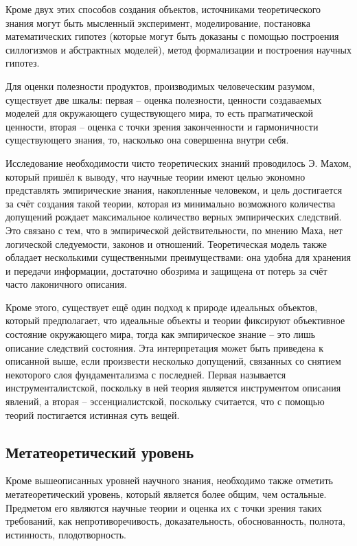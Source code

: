 \documentclass[14pt]{article}
\begin{document}
Кроме двух этих способов создания объектов, источниками теоретического знания могут быть мысленный эксперимент, моделирование, постановка математических гипотез (которые могут быть доказаны с помощью построения силлогизмов и абстрактных моделей), метод формализации и построения научных гипотез.  
  
  Для оценки полезности продуктов, производимых человеческим разумом, существует две шкалы: первая -- оценка полезности, ценности создаваемых моделей для окружающего существующего мира, то есть прагматической ценности, вторая -- оценка с точки зрения законченности и гармоничности существующего знания, то, насколько она совершенна внутри себя. 
  
  Исследование необходимости чисто теоретических знаний проводилось Э. Махом, который пришёл к выводу, что научные теории имеют целью экономно представлять эмпирические знания, накопленные человеком, и цель достигается за счёт создания такой теории, которая из минимально возможного количества допущений рождает максимальное количество верных эмпирических следствий. Это связано с тем, что в эмпирической действительности, по мнению Маха, нет логической следуемости, законов и отношений. Теоретическая модель также обладает несколькими существенными преимуществами: она удобна для хранения и передачи информации, достаточно обозрима и защищена от потерь за счёт часто лаконичного описания.  
  
Кроме этого, существует ещё один подход к природе идеальных объектов, который предполагает, что идеальные объекты и теории фиксируют объективное состояние окружающего мира, тогда как эмпирическое знание -- это лишь описание следствий состояния. Эта интерпретация может быть приведена к описанной выше, если произвести несколько допущений, связанных со снятием некоторого слоя фундаментализма с последней. Первая называется инструменталистской, поскольку в ней теория является инструментом описания явлений, а вторая -- эссенциалистской, поскольку считается, что с помощью теорий постигается истинная суть вещей. 
\subsection{Метатеоретический уровень}
Кроме вышеописанных уровней научного знания, необходимо также отметить метатеоретический уровень, который является более общим, чем остальные. Предметом его являются научные теории и оценка их с точки зрения таких требований, как непротиворечивость, доказательность, обоснованность, полнота, истинность, плодотворность. 
  
\end{document}
